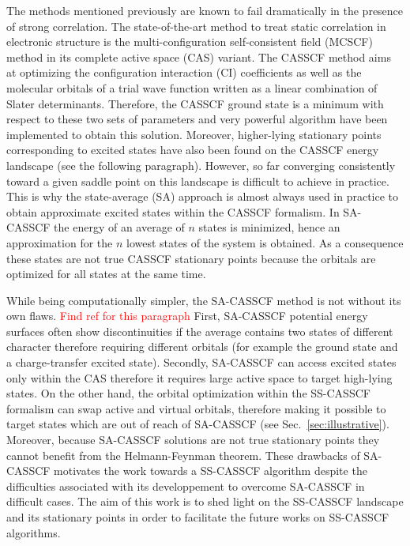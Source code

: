 \documentclass[aps,prb,reprint,showkeys,superscriptaddress]{revtex4-1}
\newcommand{\todo}[1]{\textcolor{red}{#1}}
\begin{document}
The methods mentioned previously are known to fail dramatically in the presence of strong correlation. \cite{Jensen_2017}
The state-of-the-art method to treat static correlation in electronic structure is the multi-configuration self-consistent field (MCSCF) method in its complete active space (CAS) variant. \cite{Roos_2016}
The CASSCF method aims at optimizing the configuration interaction (CI) coefficients as well as the molecular orbitals of a trial wave function written as a linear combination of Slater determinants. \cite{Helgaker_2000,Roos_2016}
Therefore, the CASSCF ground state is a minimum with respect to these two sets of parameters and very powerful algorithm have been implemented to obtain this solution. \cite{Roos_1980,Werner_1985,Sun_2017,Kreplin_2019,Kreplin_2020}
Moreover, higher-lying stationary points corresponding to excited states have also been found on the CASSCF energy landscape (see the following paragraph).
However, so far converging consistently toward a given saddle point on this landscape is difficult to achieve in practice.
This is why the state-average (SA) approach is almost always used in practice to obtain approximate excited states within the CASSCF formalism.
In SA-CASSCF the energy of an average of $n$ states is minimized, hence an approximation for the $n$ lowest states of the system is obtained.
As a consequence these states are not true CASSCF stationary points because the orbitals are optimized for all states at the same time.

While being computationally simpler, the SA-CASSCF method is not without its own flaws. \cite{Zaitsevskii_1994,Helmich-Paris_2019} \todo{Find ref for this paragraph}
First, SA-CASSCF potential energy surfaces often show discontinuities if the average contains two states of different character therefore requiring different orbitals (for example the ground state and a charge-transfer excited state). \cite{Zaitsevskii_1994}
Secondly, SA-CASSCF can access excited states only within the CAS therefore it requires large active space to target high-lying states.
On the other hand, the orbital optimization within the SS-CASSCF formalism can swap active and virtual orbitals, therefore making it possible to target states which are out of reach of SA-CASSCF (see Sec.~\ref{sec:illustrative}).
Moreover, because SA-CASSCF solutions are not true stationary points they cannot benefit from the Helmann-Feynman theorem.
These drawbacks of SA-CASSCF motivates the work towards a SS-CASSCF algorithm despite the difficulties associated with its developpement to overcome SA-CASSCF in difficult cases.
The aim of this work is to shed light on the SS-CASSCF landscape and its stationary points in order to facilitate the future works on SS-CASSCF algorithms.
\end{document}
